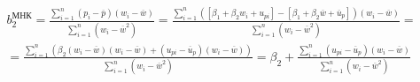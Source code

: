 \documentclass[a4paper,12pt]{article}
\begin{document}
\begin{multline*} \tag{$\Upsilon$}
	b_2^\text{МНК}=\frac{\sum\limits_{i=1}^n(p_i-\overline{p})(w_i-\overline{w})}{\sum\limits_{i=1}^n(w_i-\overline{w}^2)}=\frac{\sum\limits_{i=1}^n([\beta_1+\beta_2 w_i+u_{pi}]-[\beta_1+\beta_2\overline{w}+\overline{u}_p])(w_i-\overline{w})}{\sum\limits_{i=1}^n(w_i-\overline{w}^2)}=\\=\frac{\sum\limits_{i=1}^n(\beta_2(w_i-\overline{w})(w_i-\overline{w})+(u_{pi}-\overline{u}_p)(w_i-\overline{w}))}{\sum\limits_{i=1}^n(w_i-\overline{w}^2)}=\beta_2+\frac{\sum\limits_{i=1}^n(u_{pi}-\overline{u}_p)(w_i-\overline{w})}{\sum\limits_{i=1}^n(w_i-\overline{w}^2)} \\
\end{multline*}
\end{document}
